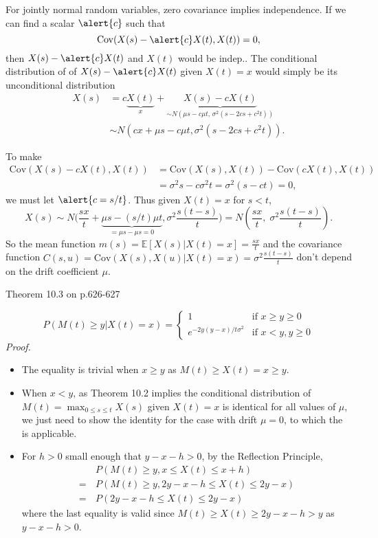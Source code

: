 \documentclass[letterpaper,handout]{beamer}
\def\E{\mathbb E}
\def\CV{\mathrm{Cov}}
\begin{document}
\begin{frame}%
\small
For jointly normal random variables, zero covariance implies independence.
If we can find a scalar $\alert{c}$ such that \[\CV(X(s)-\alert{c}X(t),X(t))=0,\]
then
$X(s)-\alert{c}X(t)$ and $X(t)$ would be indep..
The conditional distribution of of $X(s)-\alert{c} X(t)$ given $X(t)=x$ would simply be its unconditional distribution
\begin{align*}
X(s)&=c\underbrace{X(t)}_{x}+\underbrace{X(s)-cX(t)}_{\sim N(\mu s-c\mu t,\,\sigma^2(s-2cs+c^2t))}\\
&\sim N\left(cx+\mu s-c\mu t,\sigma^2(s-2cs+c^2t)\right).
\end{align*}

\vspace{-8pt}To make
\begin{align*}
\CV(X(s)-cX(t),X(t))&=\CV(X(s),X(t))-\CV(cX(t),X(t))\\
&=\sigma^2s-c\sigma^2t=\sigma^2(s-ct)=0,
\end{align*}
we must let $\alert{c=s/t}$. Thus given $X(t)=x$ for $s<t$,
\[ X(s)\sim N\bigg(\frac{sx}{t}+\underbrace{\mu s-(s/t)\mu t}_{=\mu s -\mu s = 0},\sigma^2\frac{s(t-s)}{t}\bigg)
=N\left(\frac{sx}{t},\;\sigma^2\frac{s(t-s)}{t}\right).\]
So the mean function $m(s)=\E[X(s)|X(t)=x]=\frac{sx}{t}$ and the covariance function
$C(s,u)=\CV(X(s),X(u)|X(t)=x)=\sigma^2\frac{s(t-s)}{t}$
don't depend on the drift coefficient $\mu.$
\end{frame}
\begin{frame}{Theorem 10.3 on p.626-627}

\vspace{-20pt}\[
P(M(t) \ge y|X(t) = x) =
\begin{cases}
1 & \text{if }x\ge y\ge 0\\
e^{-2y(y-x)/t\sigma^2}&\text{if }x<y, y\ge 0
\end{cases}
\]
{\it Proof.}
\begin{itemize}
\item The equality is trivial when $x\ge y$ as $M(t)\ge X(t)= x\ge y$.
\item When $x<y$, as Theorem 10.2
implies the conditional distribution of
$M(t)= \max_{0 \le s \le t}X(s)$ given $X(t)=x$ is identical for all values of $\mu$,
we just need to show the identity for the case with drift $\mu=0$,
to which the  is applicable.
\item For $h>0$ small enough that $y-x-h>0$, by the Reflection Principle,
\begin{align*}
&P(M(t) \ge y, x\le X(t) \le x+h)\\
=\,&P(M(t) \ge y, 2y-x-h\le X(t) \le 2y-x)\\
=\,&P(2y-x-h\le X(t) \le 2y-x)
\end{align*}
where the last equality is valid since
$M(t)\ge X(t)\ge 2y\!-\!x\!-\!h>y$ as $y-x-h>0$.
\end{itemize}
\end{frame}
\end{document}
